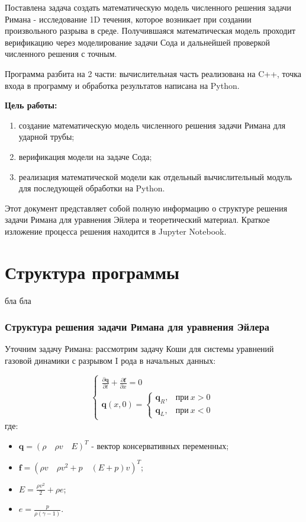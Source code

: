Поставлена задача создать математическую модель численного решения задачи Римана - исследование 1D течения, которое возникает при создании произвольного разрыва в среде. Получившаяся математическая модель проходит верификацию через моделирование задачи Сода и дальнейшей проверкой численного решения с точным.

Программа разбита на 2 части: вычислительная часть реализована на C++, точка входа в программу и обработка результатов написана на Python.

\textbf{Цель работы:}
\begin{enumerate}
\item создание математическую модель численного решения задачи Римана для ударной трубы;
\item верификация модели на задаче Сода;
\item реализация математической модели как отдельный вычислительный модуль для последующей обработки на Python.
\end{enumerate}

Этот документ представляет собой полную информацию о структуре решения задачи Римана для уравнения Эйлера и теоретический материал. Краткое изложение процесса решения находится в Jupyter Notebook.

\newpage

\part{Структура программы}\label{part_structure}

бла бла

\section{Структура решения задачи Римана для уравнения Эйлера}\label{sect_structure}

Уточним задачу Римана: рассмотрим задачу Коши для системы уравнений газовой динамики с разрывом I рода в начальных данных:

\begin{equation}
	\begin{cases}
		\frac{\partial \pmb{q}}{\partial t} + \frac{\partial \pmb{f}}{\partial x} = 0\\
		\pmb{q}(x, 0) =
		\begin{cases}
			\pmb{q}_R,&\text{при}\ x>0\\
			\pmb{q}_L,&\text{при}\ x<0
		\end{cases}
	\end{cases}
\end{equation}
где:
\begin{itemize}
	\item $\pmb{q} = (\rho\quad \rho v\quad E)^T$ - вектор консервативных переменных;
	\item $\pmb{f} = (\rho v\quad \rho v^2 + p\quad (E+p)v)^T$;
	\item $E = \frac{\rho v^2}{2} + \rho e$;
	\item $e = \frac{p}{\rho(\gamma - 1)}$.
\end{itemize}

